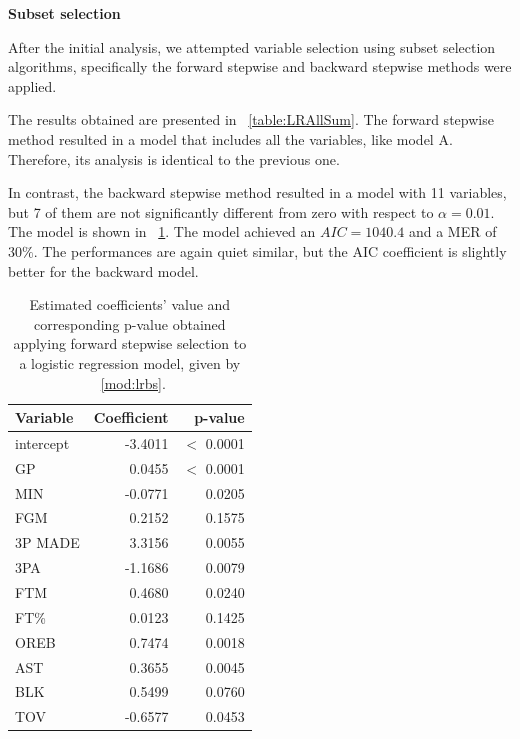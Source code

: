 \vspace{0.2cm}
\noindent
\textbf{Subset selection}

After the initial analysis, we attempted variable selection using subset selection algorithms, specifically the forward stepwise and backward stepwise methods were applied. 

The results obtained are presented in \Tab~\ref{table:LRAllSum}. The forward stepwise method resulted in a model that includes all the variables, like model A. Therefore, its analysis is identical to the previous one.

In contrast, the backward stepwise method resulted in a model with 11 variables, but 7 of them are not significantly different from zero with respect to $\alpha = 0.01$. The model is shown in \Tab~\ref{table:LRBSSum}. The model achieved an $AIC = 1040.4$ and a MER of $30\%$. The performances are again quiet similar, but the AIC coefficient is slightly better for the backward model.

\begin{center}
\end{center}

\begin{table}[h]
	\centering
	\begin{tabular}{|| l | r | r ||} 
		\hline
		Variable & Coefficient & p-value \\
		\hline
		\hline
		intercept & -3.4011 & $<$ 0.0001 \\
		GP & 0.0455 & $<$ 0.0001 \\
		MIN & -0.0771 & 0.0205 \\
		FGM & 0.2152 & 0.1575 \\
		3P MADE & 3.3156 & 0.0055 \\
		3PA & -1.1686 & 0.0079 \\
		FTM & 0.4680 & 0.0240 \\
		FT\% & 0.0123 & 0.1425 \\
		OREB & 0.7474 & 0.0018 \\
		AST & 0.3655 & 0.0045 \\
		BLK & 0.5499 & 0.0760 \\				
		TOV & -0.6577 & 0.0453 \\
		\hline
	\end{tabular}
	\caption{Estimated coefficients' value and corresponding p-value obtained applying forward stepwise selection to a logistic regression model, given by \Mod~\ref{mod:lrbs}.}
	\label{table:LRBSSum}
\end{table}

